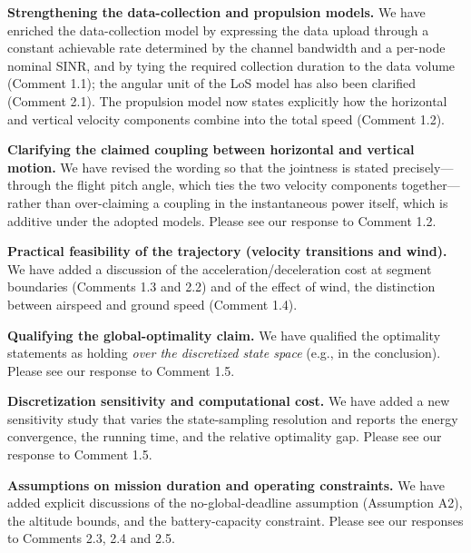 \begin{detail}
	\item \textbf{Strengthening the data-collection and propulsion models.} We have enriched the data-collection model by expressing the data upload through a constant achievable rate determined by the channel bandwidth and a per-node nominal SINR, and by tying the required collection duration to the data volume (Comment 1.1); the angular unit of the LoS model has also been clarified (Comment 2.1). The propulsion model now states explicitly how the horizontal and vertical velocity components combine into the total speed (Comment 1.2).

	\item \textbf{Clarifying the claimed coupling between horizontal and vertical motion.} We have revised the wording so that the jointness is stated precisely---through the flight pitch angle, which ties the two velocity components together---rather than over-claiming a coupling in the instantaneous power itself, which is additive under the adopted models. Please see our response to Comment 1.2.

	\item \textbf{Practical feasibility of the trajectory (velocity transitions and wind).} We have added a discussion of the acceleration/deceleration cost at segment boundaries (Comments 1.3 and 2.2) and of the effect of wind, \ie the distinction between airspeed and ground speed (Comment 1.4).

	\item \textbf{Qualifying the global-optimality claim.} We have qualified the optimality statements as holding \emph{over the discretized state space} (e.g., in the conclusion). Please see our response to Comment 1.5.

	\item \textbf{Discretization sensitivity and computational cost.} We have added a new sensitivity study that varies the state-sampling resolution and reports the energy convergence, the running time, and the relative optimality gap. Please see our response to Comment 1.5.

	\item \textbf{Assumptions on mission duration and operating constraints.} We have added explicit discussions of the no-global-deadline assumption (Assumption A2), the altitude bounds, and the battery-capacity constraint. Please see our responses to Comments 2.3, 2.4 and 2.5.
\end{detail}

